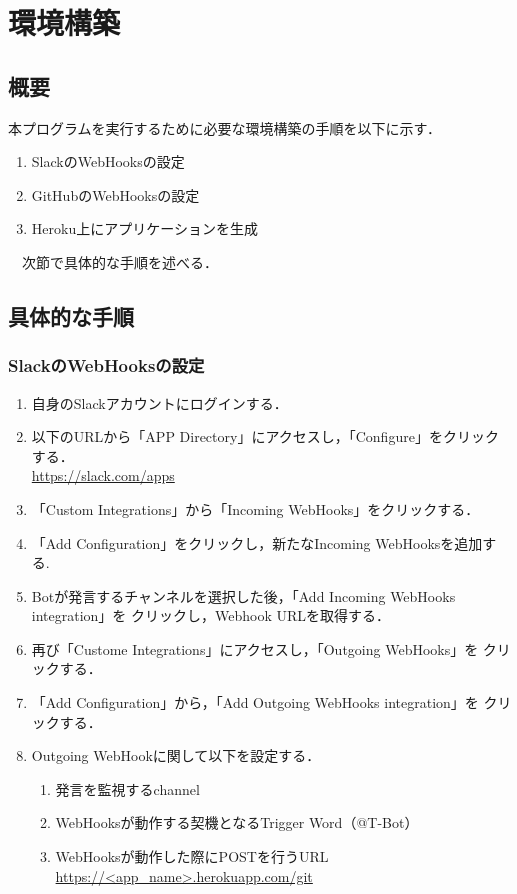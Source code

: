 \documentclass[fleqn, 14pt]{sty/extarticlej}
\begin{document}
\section{環境構築}
\label{環境構築}
\subsection{概要}
本プログラムを実行するために必要な環境構築の手順を以下に示す．
\begin{enumerate}
 \item SlackのWebHooksの設定 
 \item GitHubのWebHooksの設定
 \item Heroku上にアプリケーションを生成
\end{enumerate}
　次節で具体的な手順を述べる．
\subsection{具体的な手順}
\subsubsection{SlackのWebHooksの設定}
\begin{enumerate}
 \item 自身のSlackアカウントにログインする．

 \item 以下のURLから「APP Directory」にアクセスし，「Configure」をクリックする．\\
   \url{https://slack.com/apps}

 \item 「Custom Integrations」から「Incoming WebHooks」をクリックする．

 \item 「Add Configuration」をクリックし，新たなIncoming WebHooksを追加する.

 \item Botが発言するチャンネルを選択した後，「Add Incoming WebHooks integration」を
   クリックし，Webhook URLを取得する．

 \item 再び「Custome Integrations」にアクセスし，「Outgoing WebHooks」を
   クリックする．
   
 \item 「Add Configuration」から，「Add Outgoing WebHooks integration」を
   クリックする．

 \item Outgoing WebHookに関して以下を設定する．
   \begin{enumerate}
     \item 発言を監視するchannel
     \item WebHooksが動作する契機となるTrigger Word（@T-Bot）
     \item WebHooksが動作した際にPOSTを行うURL\\
       \url{https://<app_name>.herokuapp.com/git}
   \end{enumerate}
\end{enumerate}
\end{document}
